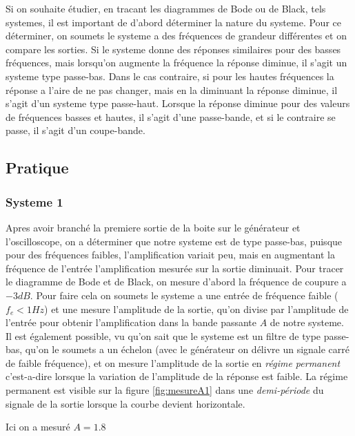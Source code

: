 \documentclass[12pt, a4paper]{report}
\begin{document}
Si on souhaite étudier, en tracant les diagrammes de Bode ou de Black, tels
systemes, il est important de d'abord déterminer la nature du systeme. Pour ce 
déterminer, on soumets le systeme a des fréquences de grandeur différentes et on
compare les sorties. Si le systeme donne des réponses similaires pour des basses fréquences,
mais lorsqu'on augmente la fréquence la réponse diminue, il s'agit un systeme type passe-bas. Dans le cas contraire,
si pour les hautes fréquences la réponse a l'aire de ne pas changer, mais en la diminuant la réponse diminue, il s'agit d'un systeme type
passe-haut. Lorsque la réponse diminue pour des valeurs de fréquences basses et hautes, il s'agit d'une passe-bande,
et si le contraire se passe, il s'agit d'un coupe-bande.

\subsection{Pratique}
\subsubsection{Systeme 1}

Apres avoir branché la premiere sortie de la boite sur le générateur et l'oscilloscope, on a déterminer que
notre systeme est de type passe-bas, puisque pour des fréquences faibles, l'amplification variait peu, mais en augmentant
la fréquence de l'entrée l'amplification mesurée sur la sortie diminuait. Pour tracer le diagramme de 
Bode et de Black, on mesure d'abord la fréquence de coupure a $-3 dB$. Pour faire cela on soumets le systeme a 
une entrée de fréquence faible ($f_e < 1 Hz$) et une mesure l'amplitude de la sortie, qu'on divise par l'amplitude 
de l'entrée pour obtenir l'amplification dans la bande passante $A$ de notre systeme. Il est également possible, 
vu qu'on sait que le systeme est un filtre de type passe-bas, qu'on le soumets a un échelon
(avec le générateur on délivre un signale carré de faible fréquence), et on mesure l'amplitude de  
la sortie en \textit{régime permanent} c'est-a-dire lorsque la variation de l'amplitude de la réponse 
est faible. La régime permanent est visible sur la figure \ref{fig:mesureA1}
dans une \textit{demi-période} du signale de la sortie lorsque la courbe devient horizontale.
\par

Ici on a mesuré $A = 1.8$
\end{document}
